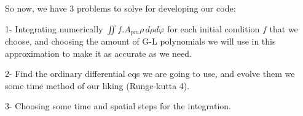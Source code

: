 	So now, we have 3 problems to solve for developing our code: 
	
	1- Integrating numerically $\iint f.A_{pm}\rho \, d\!\rho d\!\varphi $ for each initial condition $f$ that we choose, and choosing the amount of G-L polynomials we will use in this approximation to make it as accurate as we need.
	
	2- Find the ordinary differential eqs we are going to use, and evolve them we some time method of our liking (Runge-kutta 4).
	
	3- Choosing some time and spatial steps for the integration.
	
	
